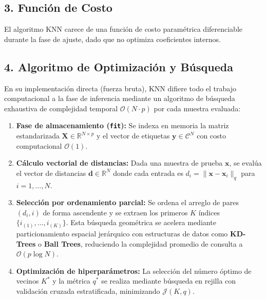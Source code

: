 \documentclass[11pt, a4paper]{article}
\begin{document}
\subsection*{3. Función de Costo}
El algoritmo KNN carece de una función de costo paramétrica diferenciable durante la fase de ajuste, dado que no optimiza coeficientes internos.

\subsection*{4. Algoritmo de Optimización y Búsqueda}
En su implementación directa (fuerza bruta), KNN difiere todo el trabajo computacional a la fase de inferencia mediante un algoritmo de búsqueda exhaustiva de complejidad temporal $\mathcal{O}(N \cdot p)$ por cada muestra evaluada:
\begin{enumerate}
    \item \textbf{Fase de almacenamiento (\texttt{fit}):} Se indexa en memoria la matriz estandarizada $\mathbf{X} \in \mathbb{R}^{N \times p}$ y el vector de etiquetas $\mathbf{y} \in \mathcal{C}^N$ con costo computacional $\mathcal{O}(1)$.
    \item \textbf{Cálculo vectorial de distancias:} Dada una muestra de prueba $\mathbf{x}$, se evalúa el vector de distancias $\mathbf{d} \in \mathbb{R}^N$ donde cada entrada es $d_i = \|\mathbf{x} - \mathbf{x}_i\|_q$ para $i = 1, \dots, N$.
    \item \textbf{Selección por ordenamiento parcial:} Se ordena el arreglo de pares $(d_i, i)$ de forma ascendente y se extraen los primeros $K$ índices $\{i_{(1)}, \dots, i_{(K)}\}$. Esta búsqueda geométrica se acelera mediante particionamiento espacial jerárquico con estructuras de datos como \textbf{KD-Trees} o \textbf{Ball Trees}, reduciendo la complejidad promedio de consulta a $\mathcal{O}(p \log N)$.
    \item \textbf{Optimización de hiperparámetros:} La selección del número óptimo de vecinos $K^*$ y la métrica $q^*$ se realiza mediante búsqueda en rejilla con validación cruzada estratificada, minimizando $\mathcal{J}(K, q)$.
\end{enumerate}
\end{document}
